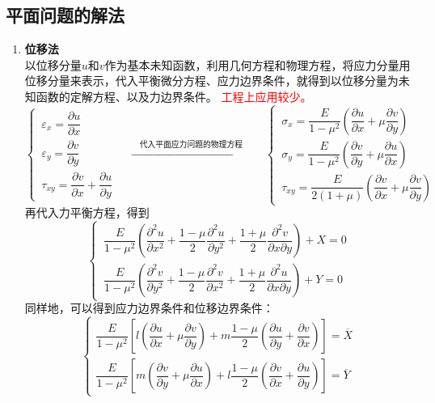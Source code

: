 \documentclass[10pt,a4]{article}
\numberwithin{equation}{section}
\newcommand{\red}[1][]{\textcolor{red}{#1}}
\begin{document}
	\subsection{平面问题的解法}
	\begin{enumerate}[\textbf{方法} 1 ]
		\item \textbf{位移法}\\
		\hspace*{1.75em} 以位移分量$u$和$v$作为基本未知函数，利用几何方程和物理方程，将应力分量用位移分量来表示，代入平衡微分方程、应力边界条件，就得到以位移分量为未知函数的定解方程、以及力边界条件。
		\red[工程上应用较少。]
		\begin{equation}
			\begin{cases}
				\, \varepsilon_x = \dfrac{\partial u}{\partial x}\\[0.7em]
				\, \varepsilon_y = \dfrac{\partial v}{\partial y} \\[0.7em]
				\, \tau_{xy} = \dfrac{\partial v}{\partial x} + \dfrac{\partial u}{\partial y}
			\end{cases}
			\quad
			\xrightarrow{\quad \mbox{代入平面应力问题的物理方程} \quad }
			\quad
			\begin{cases}
				\, \sigma_x = \dfrac{E}{1 - \mu^2}\left(\dfrac{\partial u}{\partial x} + \mu \dfrac{\partial v}{\partial y}\right)\\[0.7em]
				\, \sigma_y = \dfrac{E}{1 - \mu^2}\left(\dfrac{\partial v}{\partial y} + \mu \dfrac{\partial u}{\partial x}\right)\\[0.7em]
				\, \tau_{xy} = \dfrac{E}{2(1+\mu)} \left(\dfrac{\partial v}{\partial x} + \mu \dfrac{\partial v}{\partial y}\right)
			\end{cases}
		\end{equation}
		再代入力平衡方程，得到
		\begin{equation}
			\begin{cases}
				\, \dfrac{E}{1 - \mu^2}\left(\dfrac{\partial^2 u}{\partial x^2} + \dfrac{1 - \mu}{2}\dfrac{\partial^2 u}{\partial y^2} + \dfrac{1 + \mu}{2}\dfrac{\partial^2 v}{\partial x \partial y}\right) + X = 0 \\[0.8em]
				\, \dfrac{E}{1 - \mu^2}\left(\dfrac{\partial^2 v}{\partial y^2} + \dfrac{1 - \mu}{2}\dfrac{\partial^2 v}{\partial x^2} + \dfrac{1 + \mu}{2}\dfrac{\partial^2 u}{\partial x \partial y}\right) + Y = 0
			\end{cases}
		\end{equation}
		同样地，可以得到应力边界条件和位移边界条件：
		\begin{equation}
			\begin{cases}
				\dfrac{E}{1 - \mu^2}\left[l \left(\dfrac{\partial u}{\partial x} + \mu \dfrac{\partial v}{\partial y}\right) + m \dfrac{1-\mu}{2}\left(\dfrac{\partial u}{\partial y} + \dfrac{\partial v}{\partial x}\right)\right] = \overline{X} \\[0.8em]
				\dfrac{E}{1 - \mu^2}\left[m \left(\dfrac{\partial v}{\partial y} + \mu \dfrac{\partial u}{\partial x}\right) + l \dfrac{1-\mu}{2}\left(\dfrac{\partial v}{\partial x} + \dfrac{\partial u}{\partial y}\right)\right] = \overline{Y} 
			\end{cases}
		\end{equation}
		

\end{enumerate}
\end{document}
